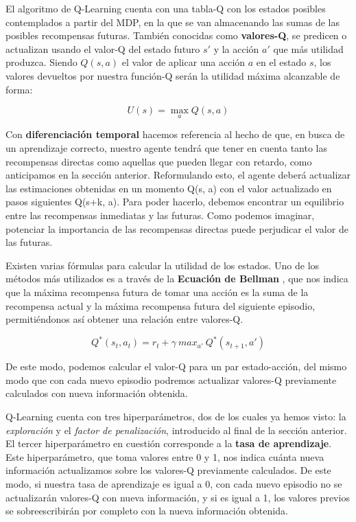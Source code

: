 El algoritmo de Q-Learning cuenta con una tabla-Q con los estados posibles contemplados a partir del MDP, en la que se van almacenando las sumas de las posibles recompensas futuras. También conocidas como \textbf{valores-Q}, se predicen o actualizan usando el valor-Q del estado futuro $s'$ y la acción $a'$ que más utilidad produzca. Siendo $Q(s, a)$ el valor de aplicar una acción $a$ en el estado $s$, los valores devueltos por nuestra función-Q serán la utilidad máxima alcanzable de forma:

$$U(s) = \max_{a}Q(s, a)$$

Con \textbf{diferenciación temporal} hacemos referencia al hecho de que, en busca de un aprendizaje correcto, nuestro agente tendrá que tener en cuenta tanto las recompensas directas como aquellas que pueden llegar con retardo, como anticipamos en la sección anterior. Reformulando esto, el agente deberá actualizar las estimaciones obtenidas en un momento Q(s, a) con el valor actualizado en pasos siguientes Q(s+k, a). Para poder hacerlo, debemos encontrar un equilibrio entre las recompensas inmediatas y las futuras. Como podemos imaginar, potenciar la importancia de las recompensas directas puede perjudicar el valor de las futuras.

Existen varias fórmulas para calcular la utilidad de los estados. Uno de los métodos más utilizados es a través de la \textbf{Ecuación de Bellman} \citep{Baird1995}, que nos indica que la máxima recompensa futura de tomar una acción es la suma de la recompensa actual y la máxima recompensa futura del siguiente episodio, permitiéndonos así obtener una relación entre valores-Q.

$$Q^*(s_{t}, a_{t}) = r_{t} + \gamma\ max_{a'}\ Q^*(s_{t+1}, a')$$

De este modo, podemos calcular el valor-Q para un par estado-acción, del mismo modo que con cada nuevo episodio podremos actualizar valores-Q previamente calculados con nueva información obtenida.

Q-Learning cuenta con tres hiperparámetros, dos de los cuales ya hemos visto: la \textit{exploración} y el \textit{factor de penalización}, introducido al final de la sección anterior. El tercer hiperparámetro en cuestión corresponde a la \textbf{tasa de aprendizaje}. Este hiperparámetro, que toma valores entre 0 y 1, nos indica cuánta nueva información actualizamos sobre los valores-Q previamente calculados. De este modo, si nuestra tasa de aprendizaje es igual a 0, con cada nuevo episodio no se actualizarán valores-Q con nueva información, y si es igual a 1, los valores previos se sobreescribirán por completo con la nueva información obtenida.

